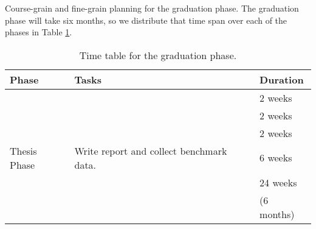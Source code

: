 Course-grain and fine-grain planning for the graduation phase. The graduation phase will take six months, so we distribute that time span over each of the phases in Table \ref{table:planning}.

\begin{table}[h]
\caption{Time table for the graduation phase.}
\begin{center}
\begin{tabular}{@{}p{}p{}p{}@{}}
\toprule
\textbf{Phase} & \textbf{Tasks} & \textbf{Duration} \\ \hline
	& 											& 2 weeks \\
	& 											& 2 weeks \\
	& 									 		& 2 weeks \\
Thesis Phase	& Write report and collect benchmark data. 	& 6 weeks \\
\hline%
\multicolumn{2}{c}{ \multirow{2}{*}{Total time}} 				& 24 weeks\\
	&											& (6 months)\\
\bottomrule
\end{tabular}
\end{center}
\label{table:planning}
\end{table}%
